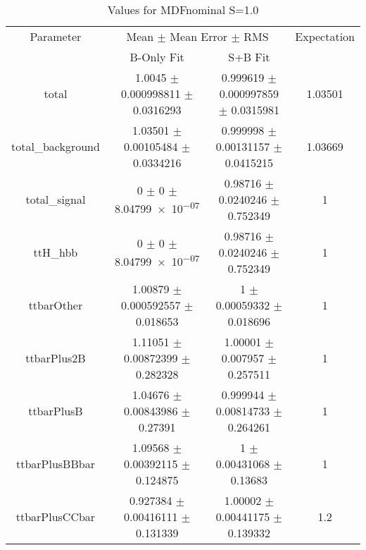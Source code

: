 \begin{table}
\centering
\caption{Values for MDFnominal S=1.0}
\begin{tabular}{cccc}
\toprule
Parameter & \multicolumn{2}{c}{Mean $\pm$ Mean Error $\pm$ RMS} & Expectation\\
 & B-Only Fit & S+B Fit & \\
\midrule
total & \num{1.0045} $\pm$ \num{0.000998811} $\pm$ \num{0.0316293} & \num{0.999619} $\pm$ \num{0.000997859} $\pm$ \num{0.0315981} & \num{1.03501}\\
total\_background & \num{1.03501} $\pm$ \num{0.00105484} $\pm$ \num{0.0334216} & \num{0.999998} $\pm$ \num{0.00131157} $\pm$ \num{0.0415215} & \num{1.03669}\\
total\_signal & \num{0} $\pm$ \num{0} $\pm$ \num{8.04799e-07} & \num{0.98716} $\pm$ \num{0.0240246} $\pm$ \num{0.752349} & \num{1}\\
ttH\_hbb & \num{0} $\pm$ \num{0} $\pm$ \num{8.04799e-07} & \num{0.98716} $\pm$ \num{0.0240246} $\pm$ \num{0.752349} & \num{1}\\
ttbarOther & \num{1.00879} $\pm$ \num{0.000592557} $\pm$ \num{0.018653} & \num{1} $\pm$ \num{0.00059332} $\pm$ \num{0.018696} & \num{1}\\
ttbarPlus2B & \num{1.11051} $\pm$ \num{0.00872399} $\pm$ \num{0.282328} & \num{1.00001} $\pm$ \num{0.007957} $\pm$ \num{0.257511} & \num{1}\\
ttbarPlusB & \num{1.04676} $\pm$ \num{0.00843986} $\pm$ \num{0.27391} & \num{0.999944} $\pm$ \num{0.00814733} $\pm$ \num{0.264261} & \num{1}\\
ttbarPlusBBbar & \num{1.09568} $\pm$ \num{0.00392115} $\pm$ \num{0.124875} & \num{1} $\pm$ \num{0.00431068} $\pm$ \num{0.13683} & \num{1}\\
ttbarPlusCCbar & \num{0.927384} $\pm$ \num{0.00416111} $\pm$ \num{0.131339} & \num{1.00002} $\pm$ \num{0.00441175} $\pm$ \num{0.139332} & \num{1.2}\\
\bottomrule
\end{tabular}
\end{table}